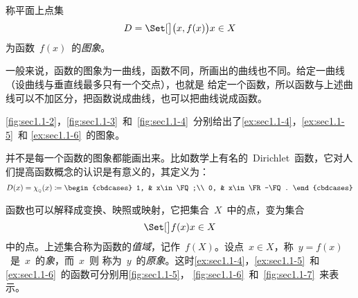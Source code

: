 \begin{definition}
称平面上点集
\[
  D=\Setb{\Parenb{x,f(x)}}{x\in X}
\]
为函数~$f(x)$~的\emph{图象}。
\end{definition}

一般来说，函数的图象为一曲线，函数不同，所画出的曲线也不同。给定一曲线（设曲线与垂直线最多只有一个交点），也就是
给定一个函数，所以函数与上述曲线可以不加区分，把函数说成曲线，也可以把曲线说成函数。

\ref{fig:sec1.1-2}，\ref{fig:sec1.1-3}~和~\ref{fig:sec1.1-4}~分别给出了\ref{ex:sec1.1-4}，\ref{ex:sec1.1-5}~和%
\ref{ex:sec1.1-6}~的图象。

\begin{figure}
\begin{floatrow}[3]
\figurebox{\caption{}\label{fig:sec1.1-2}}
          {\somefigure}
\figurebox{\caption{}\label{fig:sec1.1-3}}
          {\somefigure}
\figurebox{\caption{}\label{fig:sec1.1-4}}
          {\somefigure}
\end{floatrow}
\end{figure}

并不是每一个函数的图象都能画出来。比如数学上有名的~Dirichlet~函数，它对人们提高函数概念的认识是有意义的，其定义为：
\[
  D(x)=\chi_{_\FQ}(x)\coloneq\begin{cbdcases}
  1, & x\in\FQ;\\
  0, & x\in\FR-\FQ.
  \end{cbdcases}
\]

函数也可以解释成变换、映照或映射，它把集合~$X$~中的点，变为集合
\[
  \Setb{f(x)}{x\in X}
\]
中的点。上述集合称为函数的\emph{值域}，记作~$f(X)$。设点~$x\in X$，称~$y=f(x)$~是~$x$~的\emph{象}，而~$x$~则
称为~$y$~的\emph{原象}。这时\ref{ex:sec1.1-4}，\ref{ex:sec1.1-5}~和\ref{ex:sec1.1-6}~的函数可分别用\ref{fig:sec1.1-5}，%
\ref{fig:sec1.1-6}~和~\ref{fig:sec1.1-7}~来表示。

\begin{figure}
\begin{floatrow}[3]
\figurebox{\caption{}\label{fig:sec1.1-5}}
          {\somefigure}
\figurebox{\caption{}\label{fig:sec1.1-6}}
          {\somefigure}
\figurebox{\caption{}\label{fig:sec1.1-7}}
          {\somefigure}
\end{floatrow}
\end{figure}

